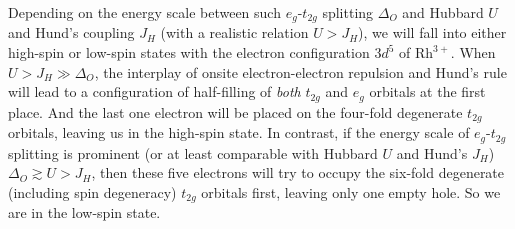\documentclass[10pt,nofootinbib,letterpaper]{revtex4}
\begin{document}
		Depending on the energy scale between such $e_g$-$t_{2g}$ splitting $\Delta_O$ and Hubbard $U$ and Hund's coupling $J_H$ (with a realistic relation $U>J_H$), we will fall into either high-spin or low-spin states with the electron configuration $3d^5$ of $\mathrm{Rh}^{3+}$. When $U>J_H\gg\Delta_O$, the interplay of onsite electron-electron repulsion and Hund's rule will lead to a configuration of half-filling of \emph{both} $t_{2g}$ and $e_g$ orbitals at the first place. And the last one electron will be placed on the four-fold degenerate $t_{2g}$ orbitals, leaving us in the high-spin state. In contrast, if the energy scale of $e_g$-$t_{2g}$ splitting is prominent (or at least comparable with Hubbard $U$ and Hund's $J_H$) $\Delta_O\gtrsim U>J_H$, then these five electrons will try to occupy the six-fold degenerate (including spin degeneracy) $t_{2g}$ orbitals first, leaving only one empty hole. So we are in the low-spin state.\par
\end{document}

